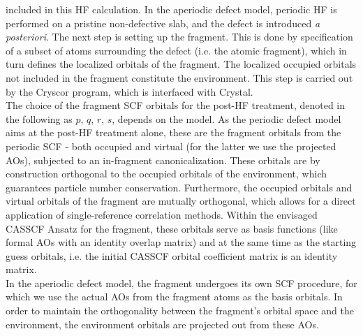 \documentclass[a4paper,11pt,headings=normal]{scrartcl}
\begin{document}
included in this HF calculation. In the aperiodic defect model, periodic HF is 
performed on a pristine non-defective slab, and the defect is introduced 
\textit{a posteriori}.
The next step is setting up the fragment. This is done by specification of a 
subset of atoms surrounding the defect (i.e. the atomic fragment), which in turn defines the localized orbitals of the fragment.
The localized occupied orbitals not included in the fragment 
constitute the environment. This step is carried out by the 
Cryscor program,\autocite{usvyat18} which is interfaced with Crystal.\\
The choice of the fragment SCF orbitals for the post-HF treatment, denoted in the following as $p$, 
$q$, $r$, $s$, depends on the model. As the periodic 
defect model aims at the post-HF treatment alone,
these are the fragment orbitals from the periodic SCF - both occupied and virtual (for the latter we use the projected AOs), subjected to an in-fragment canonicalization. These orbitals are by construction 
orthogonal to the occupied orbitals of the environment,
which guarantees 
particle number conservation. Furthermore, the occupied orbitals and virtual 
orbitals of the fragment are mutually orthogonal, which allows for a direct 
application of single-reference correlation methods. Within the envisaged 
CASSCF Ansatz for the fragment, these orbitals serve as basis functions (like 
formal AOs with an identity overlap matrix) and at the same time as the 
starting guess orbitals, i.e. the initial CASSCF orbital coefficient matrix is 
an identity matrix.\\
In the aperiodic defect model,
the fragment undergoes its own SCF procedure, for which we use the actual 
AOs from the fragment atoms as the basis orbitals. In order to maintain the 
orthogonality between the fragment's orbital space and the environment, 
the environment orbitals are projected out from these AOs.\\
\end{document}
